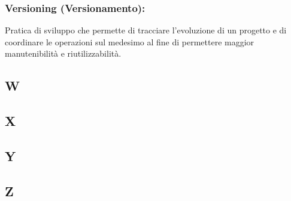 \subsubsection*{Versioning (Versionamento):} Pratica di sviluppo che permette di
tracciare l'evoluzione di un progetto e di coordinare le operazioni sul
medesimo al fine di permettere maggior manutenibilit\`a e riutilizzabilit\`a.
\subsection*{W}
\subsection*{X}
\subsection*{Y}
\subsection*{Z}







